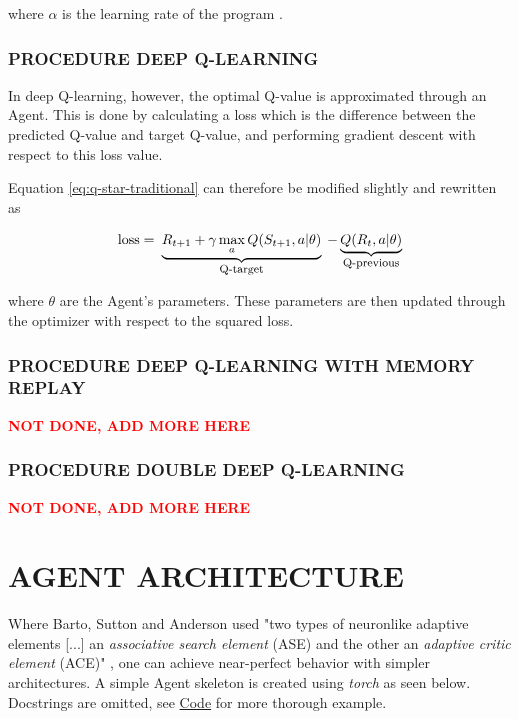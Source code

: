 \documentclass{article}
\renewenvironment{leftbar}[1][\hsize]{
    \def\FrameCommand{{\color{barcolor}\vrule width 0.5pt \hspace{10pt}}}
    \MakeFramed{\hsize#1 \advance\hsize-\width \FrameRestore}
}{\endMakeFramed}
\newcommand{\explain}[2]{\underbrace{#1}_{\parbox{\widthof{\ensuremath{#1}}}{\footnotesize\centering #2}}}
\begin{document}
\begin{leftbar}
    where $\alpha$ is the learning rate of the program \cite{Q-deep}.

    \subsubsection*{PROCEDURE \hfill DEEP Q-LEARNING}

    In deep Q-learning, however, the optimal Q-value is approximated through an Agent. This is done by calculating a loss which is the difference between the predicted Q-value and target Q-value, and performing gradient descent with respect to this loss value. \cite{Q-deep}

    Equation \eqref{eq:q-star-traditional} can therefore be modified slightly and rewritten as

    \begin{equation*}
        \text{loss} = \explain{R_{t+1} + \gamma \max_a Q(S_{t+1}, a | \theta)}{\text{Q-target}} - \explain{Q(R_t, a | \theta)}{\text{Q-previous}}
    \end{equation*}

    where $\theta$ are the Agent's parameters. These parameters are then updated through the optimizer with respect to the squared loss. \cite{Q-deep}

    \subsubsection*{PROCEDURE \hfill DEEP Q-LEARNING WITH MEMORY REPLAY}

    \cite{Q-deep}
    \textbf{\textcolor{red}{NOT DONE, ADD MORE HERE}}

    \subsubsection*{PROCEDURE \hfill DOUBLE DEEP Q-LEARNING}

    \cite{Q-deep}
    \textbf{\textcolor{red}{NOT DONE, ADD MORE HERE}}

\end{leftbar}

\section*{AGENT ARCHITECTURE}

Where Barto, Sutton and Anderson used "two types of neuronlike adaptive elements [...] an \textit{associative search element} (ASE) and the other an \textit{adaptive critic element} (ACE)" \cite{Neuronlike}, one can achieve near-perfect behavior with simpler architectures. A simple Agent skeleton is created using \textit{torch} as seen below. Docstrings are omitted, see \hyperlink{sec:code}{Code} for more thorough example.
\end{document}
